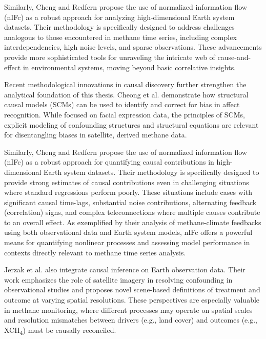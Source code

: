 Similarly, Cheng and Redfern \cite{cheng2021} propose the use of normalized information flow (nIFc) as a robust approach for analyzing high-dimensional Earth system datasets. Their methodology is specifically designed to address challenges analogous to those encountered in methane time series, including complex interdependencies, high noise levels, and sparse observations. These advancements provide more sophisticated tools for unraveling the intricate web of cause-and-effect in environmental systems, moving beyond basic correlative insights.

Recent methodological innovations in causal discovery further strengthen the analytical foundation of this thesis. Cheong et al. \cite{cheong2021causal} demonstrate how structural causal models (SCMs) can be used to identify and correct for bias in affect recognition. While focused on facial expression data, the principles of SCMs, explicit modeling of confounding structures and structural equations are relevant for disentangling biases in satellite, derived methane data. 

Similarly, Cheng and Redfern \cite{cheng2021} propose the use of normalized information flow (nIFc) as a robust approach for quantifying causal contributions in high-dimensional Earth system datasets. Their methodology is specifically designed to provide strong estimates of causal contributions even in challenging situations where standard regressions perform poorly. These situations include cases with significant causal time-lags, substantial noise contributions, alternating feedback (correlation) signs, and complex teleconnections where multiple causes contribute to an overall effect. As exemplified by their analysis of methane-climate feedbacks using both observational data and Earth system models, nIFc offers a powerful means for quantifying nonlinear processes and assessing model performance in contexts directly relevant to methane time series analysis.

Jerzak et al. \cite{jerzak2023} also integrate causal inference on Earth observation data. Their work emphasizes the role of satellite imagery in resolving confounding in observational studies and proposes novel scene-based definitions of treatment and outcome at varying spatial resolutions. These perspectives are especially valuable in methane monitoring, where different processes may operate on spatial scales and resolution mismatches between drivers (e.g., land cover) and outcomes (e.g., XCH\textsubscript{4}) must be causally reconciled.

